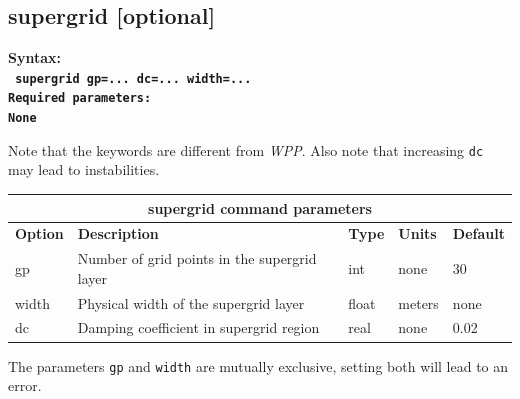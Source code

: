 \documentclass[11pt]{report}
\begin{document}
{%
\subsection{supergrid [optional]}
\label{keyword:supergrid}
\begin{flushleft}\bf
	Syntax:\\
	\tt
	supergrid gp=... dc=... width=...
	\\
	\bf Required parameters:\\
	\rm
	None
\end{flushleft}
Note that the keywords are different from \emph{WPP}. Also note that
increasing {\tt dc} may lead to instabilities.
\begin{center}
	\begin{tabular}{|l|p{10cm}|l|l|l|} \hline
		\multicolumn{5}{|c|}{\bf supergrid command parameters}                                              \\ \hline
		\bf{Option} & \bf{Description}                             & \bf{Type} & {\bf Units} & \bf{Default} \\ \hline \hline
		gp          & Number of grid points in the supergrid layer & int       & none        & 30           \\ \hline
		width       & Physical width of the supergrid layer        & float     & meters      & none         \\ \hline
		dc          & Damping coefficient in supergrid region      & real      & none        & 0.02         \\ \hline
	\end{tabular}
\end{center}
The parameters {\tt gp} and {\tt width} are mutually exclusive, setting both will lead to an error.

}
\end{document}
